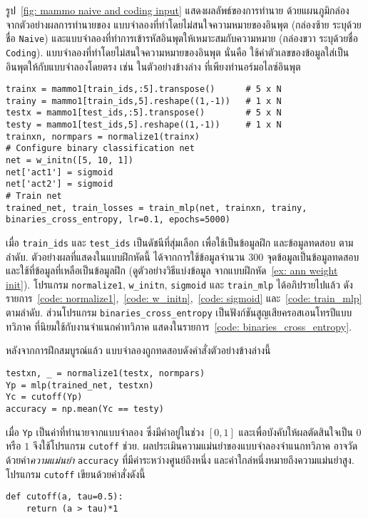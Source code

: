 \begin{Exercise}
รูป~\ref{fig: mammo naive and coding input}
แสดงผลลัพธ์ของการทำนาย
ด้วยแผนภูมิกล่อง จากตัวอย่างผลการทำนายของ  แบบจำลองที่ทำโดยไม่สนใจความหมายของอินพุต (กล่องซ้าย ระบุด้วยชื่อ \verb|Naive|)
และแบบจำลองที่ทำการเข้ารหัสอินพุตให้เหมาะสมกับความหมาย (กล่องขวา ระบุด้วยชื่อ \verb|Coding|).
แบบจำลองที่ทำโดยไม่สนใจความหมายของอินพุต
นั่นคือ ใช้ค่าตัวเลขของข้อมูลใส่เป็นอินพุตให้กับแบบจำลองโดยตรง
เช่น ในตัวอย่างข้างล่าง ที่เพียงทำนอร์มอไลซ์อินพุต
\begin{Verbatim}[fontsize=\small]
trainx = mammo1[train_ids,:5].transpose()      # 5 x N
trainy = mammo1[train_ids,5].reshape((1,-1))   # 1 x N
testx = mammo1[test_ids,:5].transpose()        # 5 x N
testy = mammo1[test_ids,5].reshape((1,-1))     # 1 x N
trainxn, normpars = normalize1(trainx)
# Configure binary classification net
net = w_initn([5, 10, 1])
net['act1'] = sigmoid
net['act2'] = sigmoid
# Train net
trained_net, train_losses = train_mlp(net, trainxn, trainy, 
binaries_cross_entropy, lr=0.1, epochs=5000)
\end{Verbatim}
เมื่อ \verb|train_ids| และ \verb|test_ids|
เป็นดัชนีที่สุ่มเลือก เพื่อใช้เป็นข้อมูลฝึก และข้อมูลทดสอบ ตามลำดับ.
ตัวอย่างผลที่แสดงในแบบฝึกหัดนี้ 
ได้จากการใช้ข้อมูลจำนวน $300$ จุดข้อมูลเป็นข้อมูลทดสอบ 
และใช้ที่ข้อมูลที่เหลือเป็นข้อมูลฝึก (ดูตัวอย่างวิธีแบ่งข้อมูล จากแบบฝึกหัด~\ref{ex: ann weight init}).
โปรแกรม \verb|normalize1|, \verb|w_initn|, \verb|sigmoid| และ \verb|train_mlp| ได้อภิปรายไปแล้ว ดังรายการ~\ref{code: normalize1},~\ref{code: w_initn},~\ref{code: sigmoid} และ~\ref{code: train_mlp} ตามลำดับ.
ส่วนโปรแกรม \verb|binaries_cross_entropy| เป็นฟังก์ชันสูญเสียครอสเอนโทรปีแบบทวิภาค ที่นิยมใช้กับงานจำแนกค่าทวิภาค
แสดงในรายการ~\ref{code: binaries_cross_entropy}.



หลังจากการฝึกสมบูรณ์แล้ว แบบจำลองถูกทดสอบดังคำสั่งตัวอย่างข้างล่างนี้
\begin{Verbatim}[fontsize=\small]
testxn, _ = normalize1(testx, normpars)
Yp = mlp(trained_net, testxn)
Yc = cutoff(Yp)
accuracy = np.mean(Yc == testy)
\end{Verbatim}
เมื่อ \verb|Yp| เป็นค่าที่ทำนายจากแบบจำลอง ซึ่งมีค่าอยู่ในช่วง $[0,1]$
และเพื่อบังคับให้ผลตัดสินใจเป็น $0$ หรือ $1$ จึงใช้โปรแกรม \verb|cutoff| ช่วย.
ผลประเมินความแม่นยำของแบบจำลองจำแนกทวิภาค อาจวัดด้วยค่า\textit{ความแม่นยำ} \verb|accuracy| ที่มีค่าระหว่างศูนย์ถึงหนึ่ง และค่าใกล่หนึ่งหมายถึงความแม่นยำสูง.
โปรแกรม \verb|cutoff| เขียนด้วยคำสั่งดังนี้
\begin{Verbatim}[fontsize=\small]
def cutoff(a, tau=0.5):
    return (a > tau)*1
\end{Verbatim}



\end{Exercise}
